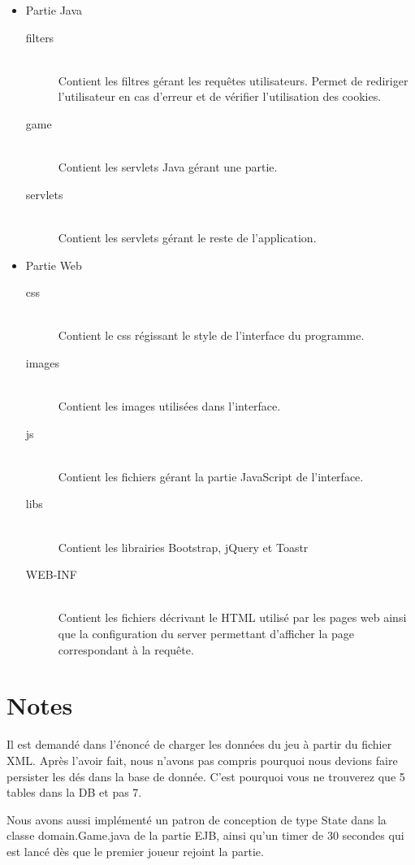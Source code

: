 \documentclass[11pt]{scrreprt}
\begin{document}
    \begin{itemize}
        \item Partie Java
        \begin{description}
            \item[filters]\hfill \\ Contient les filtres gérant les requêtes utilisateurs. Permet de rediriger l'utilisateur en cas d'erreur et de vérifier l'utilisation des cookies.
            \item[game]\hfill \\ Contient les servlets Java gérant une partie.
            \item[servlets]\hfill \\ Contient les servlets gérant le reste de l'application.
        \end{description}
        \item Partie Web
        \begin{description}
            \item[css]\hfill \\ Contient le css régissant le style de l'interface du programme.
            \item[images]\hfill \\ Contient les images utilisées dans l'interface.
            \item[js]\hfill \\ Contient les fichiers gérant la partie JavaScript de l'interface.
            \item[libs]\hfill \\ Contient les librairies Bootstrap, jQuery et Toastr
            \item[WEB-INF]\hfill \\ Contient les fichiers décrivant le HTML utilisé par les pages web ainsi que la configuration du server permettant d'afficher la page correspondant à la requête.
        \end{description}
    \end{itemize}
    \chapter{Notes}
    Il est demandé dans l'énoncé de charger les données du jeu à partir du fichier XML. Après l'avoir fait, nous n'avons pas compris pourquoi nous devions faire persister les dés dans la base de donnée. C'est pourquoi vous ne trouverez que 5 tables dans la DB et pas 7.

    Nous avons aussi implémenté un patron de conception de type \og State\fg{} dans la classe domain.Game.java de la partie EJB, ainsi qu'un timer de 30 secondes qui est lancé dès que le premier joueur rejoint la partie.
\end{document}

